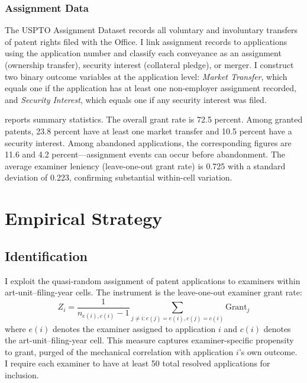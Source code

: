 \documentclass[12pt]{article}
\begin{document}
\subsubsection*{Assignment Data} The USPTO Assignment Dataset records all voluntary and involuntary transfers of patent rights filed with the Office. I link assignment records to applications using the application number and classify each conveyance as an assignment (ownership transfer), security interest (collateral pledge), or merger. I construct two binary outcome variables at the application level: \textit{Market Transfer}, which equals one if the application has at least one non-employer assignment recorded, and \textit{Security Interest}, which equals one if any security interest was filed.

 reports summary statistics. The overall grant rate is 72.5 percent. Among granted patents, 23.8 percent have at least one market transfer and 10.5 percent have a security interest. Among abandoned applications, the corresponding figures are 11.6 and 4.2 percent---assignment events can occur before abandonment. The average examiner leniency (leave-one-out grant rate) is 0.725 with a standard deviation of 0.223, confirming substantial within-cell variation.




\section{Empirical Strategy}
\label{sec:strategy}

\subsection{Identification}

I exploit the quasi-random assignment of patent applications to examiners within art-unit--filing-year cells. The instrument is the leave-one-out examiner grant rate:
\begin{equation}
Z_i = \frac{1}{n_{e(i),c(i)} - 1} \sum_{j \neq i: e(j) = e(i), c(j) = c(i)} \text{Grant}_j
\end{equation}
where $e(i)$ denotes the examiner assigned to application $i$ and $c(i)$ denotes the art-unit--filing-year cell. This measure captures examiner-specific propensity to grant, purged of the mechanical correlation with application $i$'s own outcome. I require each examiner to have at least 50 total resolved applications for inclusion.
\end{document}
